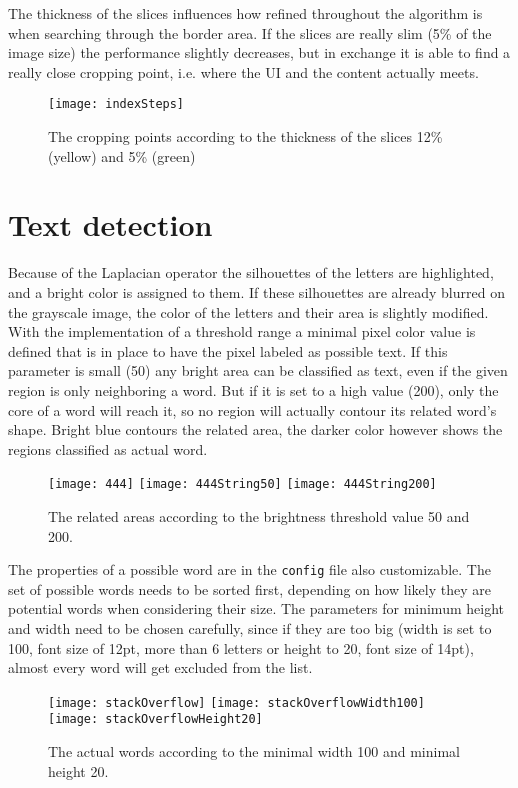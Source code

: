 \documentclass[draft,final]{vutinfth} %
\begin{document}
	The thickness of the slices influences how refined throughout the algorithm is when searching through the border area.
	If the slices are really slim (5\% of the image size) the performance slightly decreases, but in exchange it is able to find a really close cropping point, i.e. where the UI and the content actually meets.\par
	\begin{figure}[H]
		\centering
		\texttt{[image: indexSteps]}
		\caption{The cropping points according to the thickness of the slices 12\% (yellow) and 5\% (green)}
		\label{fig:res:steps}
	\end{figure}
	\section{Text detection}
	Because of the Laplacian operator the silhouettes of the letters are highlighted, and a bright color is assigned to them. 
	If these silhouettes are already blurred on the grayscale image, the color of the letters and their area is slightly modified. 
	With the implementation of a threshold range a minimal pixel color value is defined that is in place to have the pixel labeled as possible text.
	If this parameter is small (50) any bright area can be classified as text, even if the given region is only neighboring a word.
	But if it is set to a high value (200), only the core of a word will reach it, so no region will actually contour its related word's shape.
	Bright blue contours the related area, the darker color however shows the regions classified as actual word.\par
	\begin{figure}[H]
		\texttt{[image: 444]}\hfill
		\texttt{[image: 444String50]}\hfill
		\texttt{[image: 444String200]}
		\caption{The related areas according to the brightness threshold value 50 and 200. }
	\end{figure} 
	The properties of a possible word are  in the \texttt{config} file also customizable.
	The set of possible words needs to be sorted first, depending on how likely they are potential words when considering their size.
	The parameters for minimum height and width need to be chosen carefully, since if they are too big (width is set to 100, font size of 12pt, more than 6 letters or height to 20, font size of 14pt), almost every word will get excluded from the list.
	\begin{figure}[H]
		\texttt{[image: stackOverflow]}\hfill
		\texttt{[image: stackOverflowWidth100]}\hfill
		\texttt{[image: stackOverflowHeight20]}
		\caption{The actual words according to the minimal width 100 and minimal height 20. }
	\end{figure}  
\end{document}

